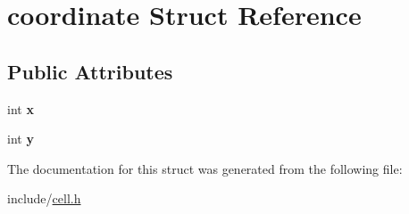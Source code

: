 \hypertarget{structcoordinate}{\section{coordinate Struct Reference}
\label{structcoordinate}
}
\subsection*{Public Attributes}
\begin{DoxyCompactItemize}
\item 
\hypertarget{structcoordinate_a8480dda1b2992713d4b0750bbdf1ee4e}{int {\bfseries x}}\label{structcoordinate_a8480dda1b2992713d4b0750bbdf1ee4e}

\item 
\hypertarget{structcoordinate_a1f90088affc8f61daa374403f148eeb7}{int {\bfseries y}}\label{structcoordinate_a1f90088affc8f61daa374403f148eeb7}

\end{DoxyCompactItemize}


The documentation for this struct was generated from the following file\-:\begin{DoxyCompactItemize}
\item 
include/\hyperlink{cell_8h}{cell.\-h}\end{DoxyCompactItemize}
